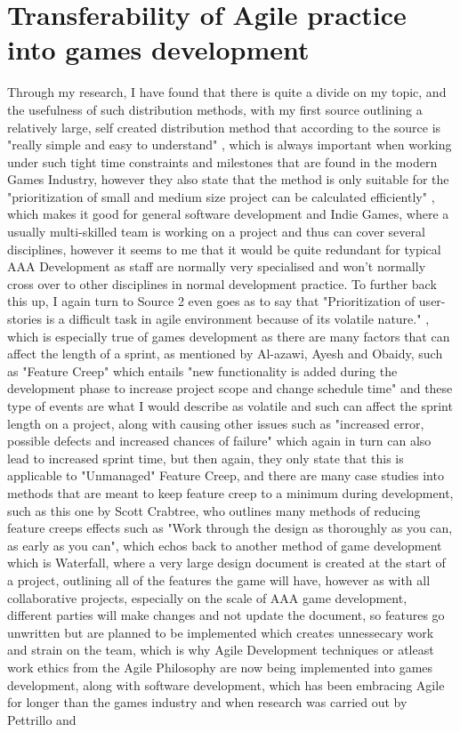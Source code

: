 \documentclass{scrartcl}
\begin{document}
\section{Transferability of Agile practice into games development}

Through my research, I have found that there is quite a divide on my topic, and the usefulness of such distribution methods, with my first source outlining a relatively large, self created distribution method that according to the source is "really simple and easy to understand" \cite{popli2014prioritising}, which is always important when working under such tight time constraints and milestones that are found in the modern Games Industry, however they also state that the method is only suitable for the "prioritization of small and medium size project can be calculated efficiently" \cite{popli2014prioritising}, which makes it good for general software development and Indie Games, where a usually multi-skilled team is working on a project and thus can cover several disciplines, however it seems to me that it would be quite redundant for typical AAA Development as staff are normally very specialised and won't normally cross over to other disciplines in normal development practice. To further back this up, I again turn to Source 2 even goes as to say that "Prioritization of user-stories is a difficult task in agile environment because of its volatile nature." \cite{popli2014prioritising}, which is especially true of games development as there are many factors that can affect the length of a sprint, as mentioned by Al-azawi, Ayesh and Obaidy, such as "Feature Creep" \cite{al2014towards} which entails "new functionality is added during the development phase to increase project scope and change schedule time" \cite{al2014towards} and these type of events are what I would describe as volatile and such can affect the sprint length on a project, along with causing other issues such as "increased error, possible defects and increased chances of failure" \cite{al2014towards} which again in turn can also lead to increased sprint time, but then again, they only state that this is applicable to "Unmanaged" \cite{al2014towards} Feature Creep, and there are many case studies into methods that are meant to keep feature creep to a minimum during development, such as this one by Scott Crabtree, who outlines many methods of reducing feature creeps effects such as "Work through the design as thoroughly as you can, as early as you can"\cite{featurecreep}, which echos back to another method of game development which is Waterfall, where a very large design document is created at the start of a project, outlining all of the features the game will have, however as with all collaborative projects, especially on the scale of AAA game development, different parties will make changes and not update the document, so features go unwritten but are planned to be implemented which creates unnessecary work and strain on the team, which is why Agile Development techniques or atleast work ethics from the Agile Philosophy are now being implemented into games development, along with software development, which has been embracing Agile for longer than the games industry and when research was carried out by Pettrillo and 
\end{document}
